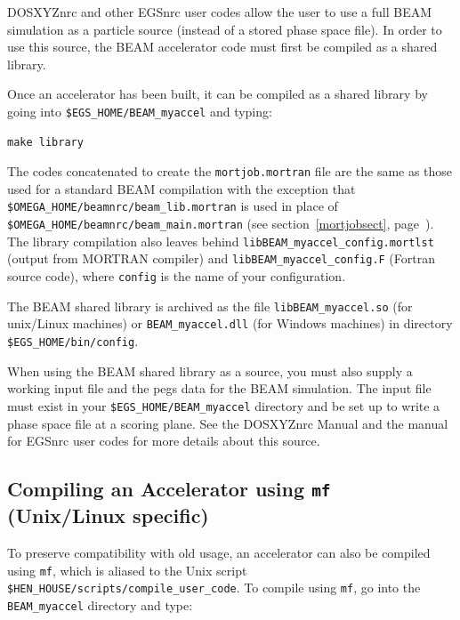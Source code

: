 \documentclass[12pt,twoside]{article}
\begin{document}
DOSXYZnrc\cite{Wa05} and other EGSnrc user codes\cite{Ro03} allow the user
to use a full BEAM simulation as a particle source (instead of a stored phase space
file).  In order to use this source, the BEAM accelerator code must first
be compiled as a shared library.

Once an accelerator has been built,
it can be compiled
as a shared library by going into {\tt \$EGS\_HOME/BEAM\_myaccel} and
typing:
\begin{verbatim}
make library
\end{verbatim}
The codes concatenated to create the {\tt mortjob.mortran} file are the same
as those used for a standard BEAM compilation with the exception that
\\{\tt \$OMEGA\_HOME/beamnrc/beam\_lib.mortran} is used in place of\\
{\tt \$OMEGA\_HOME/beamnrc/beam\_main.mortran} (see
section~\ref{mortjobsect}, page~\pageref{mortjobsect}).
The library compilation also leaves behind
{\tt libBEAM\_myaccel\_config.mortlst} (output from MORTRAN compiler) and
{\tt libBEAM\_myaccel\_config.F} (Fortran source code), where {\tt config}
is the name of your configuration.

The BEAM shared library is archived as the file {\tt libBEAM\_myaccel.so} (for
unix/Linux machines) or {\tt BEAM\_myaccel.dll} (for Windows machines) in
directory {\tt \$EGS\_HOME/bin/config}.

When using the BEAM shared library as a source, you must also supply
a working input file and the pegs data for the BEAM simulation.  The input
file must exist in your {\tt \$EGS\_HOME/BEAM\_myaccel} directory and
be set up to write a phase space file at a scoring plane.  See the
DOSXYZnrc Manual\cite{Wa05} and the manual for EGSnrc user codes\cite{Ro03}
for more details about this source.

\subsection{Compiling an Accelerator using {\tt mf} (Unix/Linux specific)}
To preserve compatibility with old usage, an accelerator can also be
compiled using {\tt mf}, which is aliased to the Unix script
{\tt \$HEN\_HOUSE/scripts/compile\_user\_code}.  To compile using
{\tt mf}, go into the {\tt BEAM\_myaccel} directory and type:
\end{document}
